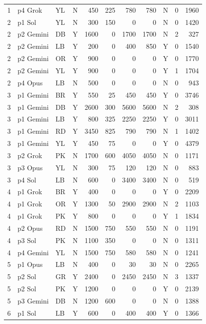 \begin{longtable}{r l l l r r r r l r r}
1 & p4 Grok & YL & N & 450 & 225 & 780 & 780 & N & 0 & 1960 \\
2 & p1 Sol & YL & N & 300 & 150 & 0 & 0 & N & 0 & 1420 \\
2 & p2 Gemini & DB & Y & 1600 & 0 & 1700 & 1700 & N & 2 & 327 \\
2 & p2 Gemini & LB & Y & 200 & 0 & 400 & 850 & Y & 0 & 1540 \\
2 & p2 Gemini & OR & Y & 900 & 0 & 0 & 0 & Y & 0 & 1770 \\
2 & p2 Gemini & YL & Y & 900 & 0 & 0 & 0 & Y & 1 & 1704 \\
2 & p4 Opus & LB & N & 500 & 0 & 0 & 0 & N & 0 & 943 \\
3 & p1 Gemini & BR & Y & 550 & 25 & 450 & 450 & Y & 0 & 3746 \\
3 & p1 Gemini & DB & Y & 2600 & 300 & 5600 & 5600 & N & 2 & 308 \\
3 & p1 Gemini & LB & Y & 800 & 325 & 2250 & 2250 & Y & 0 & 3011 \\
3 & p1 Gemini & RD & Y & 3450 & 825 & 790 & 790 & N & 1 & 1402 \\
3 & p1 Gemini & YL & Y & 450 & 75 & 0 & 0 & Y & 0 & 4379 \\
3 & p2 Grok & PK & N & 1700 & 600 & 4050 & 4050 & N & 0 & 1171 \\
3 & p3 Opus & YL & N & 300 & 75 & 120 & 120 & N & 0 & 883 \\
3 & p4 Sol & LB & N & 600 & 0 & 3400 & 3400 & N & 0 & 519 \\
4 & p1 Grok & BR & Y & 400 & 0 & 0 & 0 & Y & 0 & 2209 \\
4 & p1 Grok & OR & Y & 1300 & 50 & 2900 & 2900 & N & 2 & 1103 \\
4 & p1 Grok & PK & Y & 800 & 0 & 0 & 0 & Y & 1 & 1834 \\
4 & p2 Opus & RD & N & 1500 & 750 & 550 & 550 & N & 0 & 1191 \\
4 & p3 Sol & PK & N & 1100 & 350 & 0 & 0 & N & 0 & 1311 \\
4 & p4 Gemini & YL & N & 1500 & 750 & 580 & 580 & N & 0 & 1241 \\
5 & p1 Opus & LB & N & 400 & 0 & 30 & 30 & N & 0 & 2265 \\
5 & p2 Sol & GR & Y & 2400 & 0 & 2450 & 2450 & N & 3 & 1337 \\
5 & p2 Sol & PK & Y & 1200 & 0 & 0 & 0 & Y & 0 & 2139 \\
5 & p3 Gemini & DB & N & 1200 & 600 & 0 & 0 & N & 0 & 1388 \\
6 & p1 Sol & LB & Y & 600 & 0 & 400 & 400 & Y & 0 & 1366 \\

\end{longtable}
